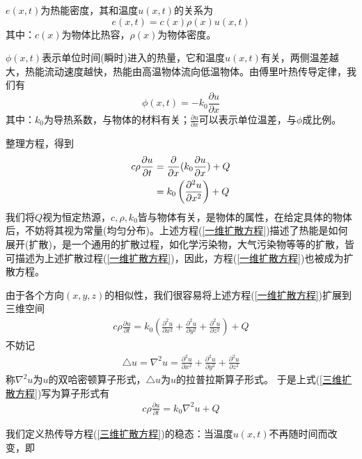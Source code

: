         $e(x,t)$为热能密度，其和温度$u(x, t)$的关系为
        \[
            e(x,t) = c(x)\rho (x) u(x,t)
        \]
        其中：$c(x)$为物体比热容，$\rho(x)$为物体密度。
        \par
        $\phi (x, t)$表示单位时间(瞬时)进入的热量，它和温度$u(x,t)$有关，两侧温差越大，热能流动速度越快，热能由高温物体流向低温物体。由傅里叶热传导定律，我们有
        \[
            \phi (x,t) = -k_0\frac{\partial u}{\partial x}
        \]
        其中：$k_0$为导热系数，与物体的材料有关；$\frac{\partial u}{\partial x}$可以表示单位温差，与$\phi$成比例。
        \par
        整理方程，得到
        \begin{align}
            \label{一维扩散方程}
            c \rho \frac{\partial u}{\partial t} &= \frac{\partial}{\partial x}(k_0 \frac{\partial u}{\partial x}) + Q \notag\\
            &= k_0\left( \frac{\partial^2 u}{\partial x^2} \right) + Q
        \end{align}
        我们将$Q$视为恒定热源，$c,\rho , k_0$皆与物体有关，是物体的属性，在给定具体的物体后，不妨将其视为常量(均匀分布)。上述方程(\ref{一维扩散方程})描述了热能是如何展开(扩散)，是一个通用的扩散过程，如化学污染物，大气污染物等等的扩散，皆可描述为上述扩散过程(\ref{一维扩散方程})，因此，方程(\ref{一维扩散方程})也被成为扩散方程。
        \par
        由于各个方向$(x,y,z)$的相似性，我们很容易将上述方程(\ref{一维扩散方程})扩展到三维空间
        \begin{align}
            \label{三维扩散方程}
            c \rho \frac{\partial u}{\partial t} = k_0\left( \frac{\partial^2 u}{\partial x^2} + \frac{\partial^2 u}{\partial y^2} + \frac{\partial^2 u}{\partial z^2}\right ) + Q
        \end{align}
        不妨记
        \begin{align*}
            \triangle u = \nabla^2 u = \frac{\partial^2 u}{\partial x^2} + \frac{\partial^2 u}{\partial y^2} + \frac{\partial^2 u}{\partial z^2}
        \end{align*}
        称$\nabla^2 u $为$u$的双哈密顿算子形式，$\triangle u$为$u$的拉普拉斯算子形式。
        于是上式(\ref{三维扩散方程})写为算子形式有
        \begin{align*}
            c \rho \frac{\partial u}{\partial t} = k_0 \nabla^2 u + Q
        \end{align*}
        \par
        我们定义热传导方程(\ref{三维扩散方程})的稳态：当温度$u(x,t)$不再随时间而改变，即
